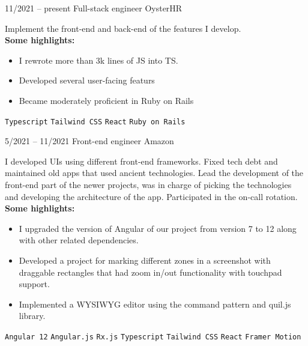 \documentclass[9pt]{developercv} %
\begin{document}
\begin{entrylist}

	\entry
		{11/2021 -- present}
		{Full-stack engineer}
		{OysterHR}
		{ Implement the front-end and back-end of the features I develop. 
		\\   \textbf{Some highlights:}
		\begin{itemize}
			\setlength\itemsep{0em}
				\item I rewrote more than 3k lines of JS into TS. 
				\item Developed several user-facing featurs
				\item Became moderately proficient in Ruby on Rails
		\end{itemize}
			\texttt{Typescript}\slashsep
		\texttt{Tailwind CSS}\slashsep
		\texttt{React}\slashsep
		\texttt{Ruby on Rails}
		}

	\entry
		{5/2021 -- 11/2021}
		{Front-end engineer}
		{Amazon}
		{ I developed UIs using different front-end frameworks. Fixed tech debt and maintained old apps that used ancient technologies. Lead the development of the front-end part 
			of the newer projects, was in charge of picking the technologies and developing the architecture of the app. Participated in the on-call rotation.
		\\   \textbf{Some highlights:}
		\begin{itemize}
			\setlength\itemsep{0em}
				\item I upgraded the version of Angular of our project from version 7 to 12 along with other related dependencies.
				\item Developed a project for marking different zones in a screenshot with draggable rectangles that had zoom in/out functionality with touchpad support.
				\item Implemented a WYSIWYG editor using the command pattern and quil.js library.
		\end{itemize}
        \texttt{Angular 12}\slashsep
        \texttt{Angular.js}\slashsep
        \texttt{Rx.js}\slashsep
		\texttt{Typescript}\slashsep
		\texttt{Tailwind CSS}\slashsep
		\texttt{React}\slashsep
		\texttt{Framer Motion}
		}
	

\end{entrylist}
\end{document}
